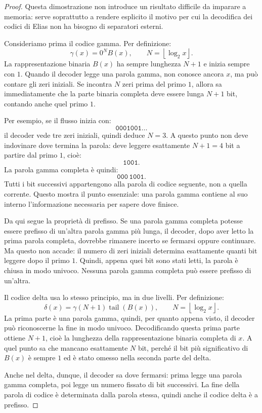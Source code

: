 \documentclass{article}
\theoremstyle{definition}
\numberwithin{equation}{section}
\begin{document}
\begin{proof}
    Questa dimostrazione non introduce un risultato difficile da imparare a memoria: serve soprattutto a rendere esplicito il motivo per cui la decodifica dei codici di Elias non ha bisogno di separatori esterni.

    Consideriamo prima il codice gamma. Per definizione:
    \[
        \gamma(x)=0^N B(x),
        \qquad
        N=\left\lfloor\log_2 x\right\rfloor.
    \]
    La rappresentazione binaria $B(x)$ ha sempre lunghezza $N+1$ e inizia sempre con $1$. Quando il decoder legge una parola gamma, non conosce ancora $x$, ma può contare gli zeri iniziali. Se incontra $N$ zeri prima del primo $1$, allora sa immediatamente che la parte binaria completa deve essere lunga $N+1$ bit, contando anche quel primo $1$.

    Per esempio, se il flusso inizia con:
    \[
        \texttt{0001001}\ldots
    \]
    il decoder vede tre zeri iniziali, quindi deduce $N=3$. A questo punto non deve indovinare dove termina la parola: deve leggere esattamente $N+1=4$ bit a partire dal primo $1$, cioè:
    \[
        \texttt{1001}.
    \]
    La parola gamma completa è quindi:
    \[
        \texttt{000}\,\texttt{1001}.
    \]
    Tutti i bit successivi appartengono alla parola di codice seguente, non a quella corrente. Questo mostra il punto essenziale: una parola gamma contiene al suo interno l'informazione necessaria per sapere dove finisce.

    Da qui segue la proprietà di prefisso. Se una parola gamma completa potesse essere prefisso di un'altra parola gamma più lunga, il decoder, dopo aver letto la prima parola completa, dovrebbe rimanere incerto se fermarsi oppure continuare. Ma questo non accade: il numero di zeri iniziali determina esattamente quanti bit leggere dopo il primo $1$. Quindi, appena quei bit sono stati letti, la parola è chiusa in modo univoco. Nessuna parola gamma completa può essere prefisso di un'altra.

    Il codice delta usa lo stesso principio, ma in due livelli. Per definizione:
    \[
        \delta(x)=\gamma(N+1)\operatorname{tail}(B(x)),
        \qquad
        N=\left\lfloor\log_2 x\right\rfloor.
    \]
    La prima parte è una parola gamma, quindi, per quanto appena visto, il decoder può riconoscerne la fine in modo univoco. Decodificando questa prima parte ottiene $N+1$, cioè la lunghezza della rappresentazione binaria completa di $x$. A quel punto sa che mancano esattamente $N$ bit, perché il bit più significativo di $B(x)$ è sempre $1$ ed è stato omesso nella seconda parte del delta.

    Anche nel delta, dunque, il decoder sa dove fermarsi: prima legge una parola gamma completa, poi legge un numero fissato di bit successivi. La fine della parola di codice è determinata dalla parola stessa, quindi anche il codice delta è a prefisso.
\end{proof}
\end{document}
